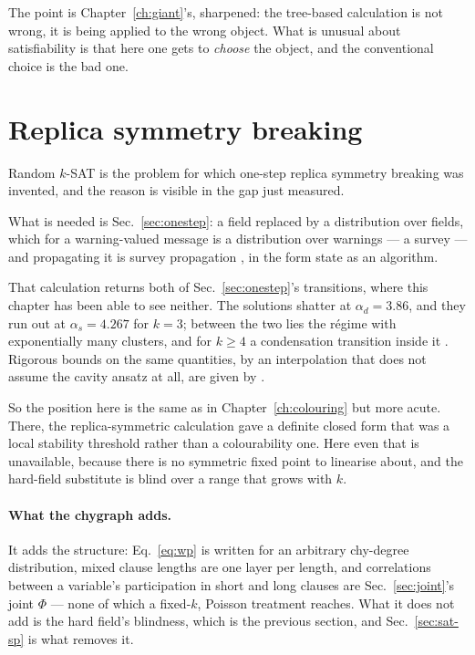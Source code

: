 The point is Chapter~\ref{ch:giant}'s, sharpened: the tree-based calculation is
not wrong, it is being applied to the wrong object. What is unusual about
satisfiability is that here one gets to \emph{choose} the object, and the
conventional choice is the bad one.

\section{Replica symmetry breaking}
\label{sec:sat-rsb}

Random $k$-SAT is the problem for which one-step replica symmetry breaking was
invented, and the reason is visible in the gap just measured.

What is needed is Sec.~\ref{sec:onestep}: a field replaced by a distribution
over fields, which for a warning-valued message is a distribution over warnings
--- a survey --- and propagating it is survey propagation
\citep{mezard2002science,mezard2002pre}, in the form
\citet{braunstein2005} state as an algorithm.

That calculation returns both of Sec.~\ref{sec:onestep}'s transitions, where
this chapter has been able to see neither. The solutions shatter at
$\alpha_{d}=3.86$, and they run out at $\alpha_{s}=4.267$ for $k=3$; between the
two lies the r\'egime with exponentially many clusters, and for $k\ge4$ a
condensation transition inside it \citep{montanari2008}. Rigorous bounds on the same
quantities, by an interpolation that does not assume the cavity ansatz at all,
are given by \citet{franz2003}.

So the position here is the same as in Chapter~\ref{ch:colouring} but more
acute. There, the replica-symmetric calculation gave a definite closed form that
was a local stability threshold rather than a colourability one. Here even that
is unavailable, because there is no symmetric fixed point to linearise about,
and the hard-field substitute is blind over a range that grows with $k$.

\paragraph{What the chygraph adds.} It adds the structure:
Eq.~\eqref{eq:wp} is written for an arbitrary chy-degree distribution, mixed
clause lengths are one layer per length, and correlations between a variable's
participation in short and long clauses are Sec.~\ref{sec:joint}'s joint
$\Phi$ --- none of which a fixed-$k$, Poisson treatment reaches. What it does
not add is the hard field's blindness, which is the previous section, and
Sec.~\ref{sec:sat-sp} is what removes it.

